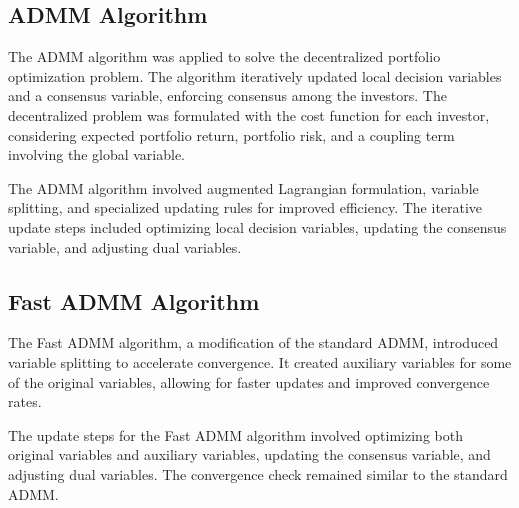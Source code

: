 \documentclass{article}
\begin{document}
	\subsection*{ADMM Algorithm}
	
	The ADMM algorithm was applied to solve the decentralized portfolio optimization problem. The algorithm iteratively updated local decision variables and a consensus variable, enforcing consensus among the investors. The decentralized problem was formulated with the cost function for each investor, considering expected portfolio return, portfolio risk, and a coupling term involving the global variable.
	
	The ADMM algorithm involved augmented Lagrangian formulation, variable splitting, and specialized updating rules for improved efficiency. The iterative update steps included optimizing local decision variables, updating the consensus variable, and adjusting dual variables.
	
	\subsection*{Fast ADMM Algorithm}
	
	The Fast ADMM algorithm, a modification of the standard ADMM, introduced variable splitting to accelerate convergence. It created auxiliary variables for some of the original variables, allowing for faster updates and improved convergence rates.
	
	The update steps for the Fast ADMM algorithm involved optimizing both original variables and auxiliary variables, updating the consensus variable, and adjusting dual variables. The convergence check remained similar to the standard ADMM.
	
		
\end{document}
